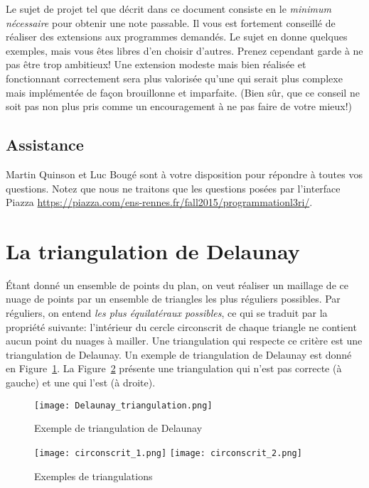 \documentclass{../../../LaTeX/tdsimple}
\begin{document}
Le sujet de projet tel que décrit dans ce document consiste en le
\emph{minimum nécessaire} pour obtenir une note passable.  Il vous est
fortement conseillé de réaliser des extensions aux programmes
demandés. Le sujet en donne quelques exemples, mais vous êtes libres
d'en choisir d'autres. Prenez cependant garde à ne pas être trop
ambitieux! Une extension modeste mais bien réalisée et fonctionnant
correctement sera plus valorisée qu'une qui serait plus complexe mais
implémentée de façon brouillonne et imparfaite. (Bien sûr, que ce
conseil ne soit pas non plus pris comme un encouragement à ne pas
faire de votre mieux!)

\subsection*{Assistance}

Martin Quinson et Luc Bougé sont à votre disposition pour répondre à
toutes vos questions. Notez que nous ne traitons que les questions
posées par l'interface Piazza
\url{https://piazza.com/ens-rennes.fr/fall2015/programmationl3ri/}.

\section{La triangulation de Delaunay}
Étant donné un ensemble de points du plan, on veut réaliser un
maillage de ce nuage de points par un ensemble de triangles les plus
réguliers possibles. Par réguliers, on entend\emph{ les plus
équilatéraux possibles}, ce qui se traduit par la propriété
suivante: l'intérieur du cercle circonscrit de chaque triangle ne
contient aucun point du nuages à mailler. Une triangulation qui
respecte ce critère est une triangulation de Delaunay. Un exemple de
triangulation de Delaunay est donné en Figure~\ref{fig:exdelaunay}.  La
Figure~\ref{fig:exs} présente une triangulation qui n'est pas correcte
(à gauche) et une qui l'est (à droite).

\begin{figure}
  \centering
  \texttt{[image: Delaunay\_triangulation.png]}
  \caption{Exemple de triangulation de Delaunay}
  \label{fig:exdelaunay}
\end{figure}

\begin{figure}
  \centering
  \texttt{[image: circonscrit\_1.png]}
  \qquad
  \texttt{[image: circonscrit\_2.png]}
  \caption{Exemples de triangulations}
  \label{fig:exs}
\end{figure}
\end{document}
